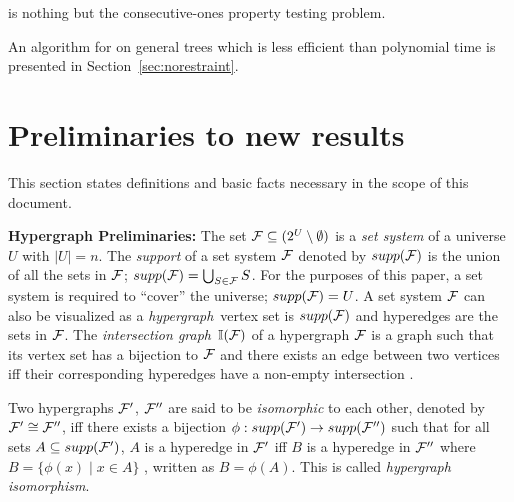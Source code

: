 \CFTPLINT is nothing but the consecutive-ones property testing
problem.

An algorithm for \CFTPL on general trees which is less efficient than
polynomial time is presented in
Section~\ref{sec:norestraint}. 



\section{Preliminaries to new results}
\label{ch:prelims}

This section states definitions and basic facts necessary in the scope
of this document.

{\bf Hypergraph Preliminaries:} The set ${\mathcal F} \subseteq (2^{U} \setminus
\emptyset)$ is a {\em set system} of a universe $U$ with $|U| = n$.
The {\em support} of a set system ${\mathcal F}$ denoted by $supp({\cal F})$ is the
union of all the sets in ${\mathcal F}$; $supp({\mathcal F}) = \bigcup_{S \in {\mathcal F}}S$. For
the purposes of this paper, a set system is required to ``cover'' the
universe; $ supp({\cal F}) = U$.  A set system ${\cal F}$ can also be visualized
as a {\em hypergraph}\, vertex set is $supp({\cal F})$ and hyperedges are
the sets in ${\cal F}$.  The {\em intersection graph}\, $\mathbb I({\cal F})$ of a
hypergraph ${\cal F}$ is a graph such that its vertex set has a bijection
to ${\cal F}$ and there exists an edge between two vertices iff their
corresponding hyperedges have a non-empty intersection \cite{mcg04}.

Two hypergraphs ${\cal F}'$, ${\cal F}''$ are said to be {\em isomorphic} to
each other, denoted by ${\cal F}' \cong {\cal F}''$, iff there exists a
bijection $\phi: supp({\cal F}') \rightarrow supp({\cal F}'')$ such that for all
sets $A \subseteq supp({\cal F}')$, $A$ is a hyperedge in ${\cal F}'$ iff $B$ is
a hyperedge in ${\cal F}''$ where $B = \{\phi(x) \mid x \in A\}$
\cite{kklv10}, written as $B=\phi(A)$.  This is called {\em hypergraph
  isomorphism}.

